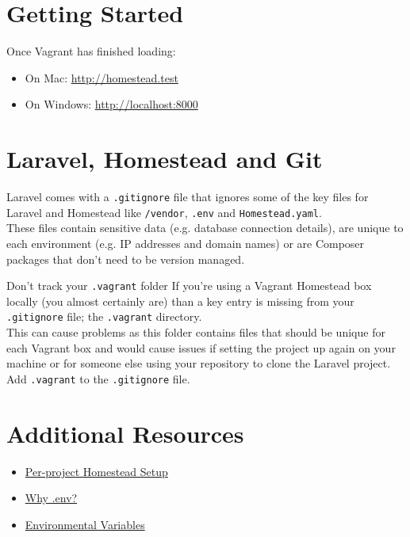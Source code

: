 \pagebreak

\section{Getting Started}

Once Vagrant has finished loading:

\begin{itemize}
    \item On Mac: \href{http://homestead.test}{http://homestead.test}
    \item On Windows: \href{http://localhost:8000}{http://localhost:8000}
\end{itemize}


\section{Laravel, Homestead and Git}

Laravel comes with a \texttt{.gitignore} file that ignores some of the key files for Laravel and Homestead like \texttt{/vendor}, \texttt{.env} and \texttt{Homestead.yaml}.
\\

These files contain sensitive data (e.g. database connection details), are unique to each environment (e.g. IP addresses and domain names) or are Composer packages that don't need to be version managed.

\begin{infobox}{Don't track your \texttt{.vagrant} folder}
    If you're using a Vagrant Homestead box locally (you almost certainly are) than a key entry is missing from your \texttt{.gitignore} file; the \texttt{.vagrant} directory.
    \\
    
    This can cause problems as this folder contains files that should be unique for each Vagrant box and would cause issues if setting the project up again on your machine or for someone else using your repository to clone the Laravel project.
    \\

    Add \texttt{.vagrant} to the \texttt{.gitignore} file.
\end{infobox}

\section{Additional Resources}

\begin{itemize}[leftmargin=*]
    \item \href{http://laravel.com/docs/master/homestead#per-project-installation}{Per-project Homestead Setup}
    \item \href{https://github.com/vlucas/phpdotenv#why-env}{Why .env?}
    \item \href{https://en.wikipedia.org/wiki/Environment\_variable}{Environmental Variables}
\end{itemize}
